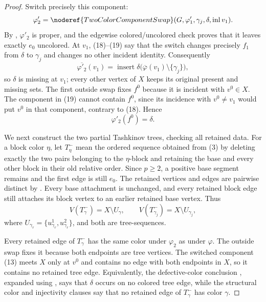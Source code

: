 \begin{proof}
Switch precisely this component:
\[
 \varphi'_2=\noderef{TwoColorComponentSwap}
   (G,\varphi'_1,\gamma_j,\delta,\operatorname{inl}v_1).
\]
By , $\varphi'_2$ is proper, and
the edgewise colored/uncolored check proves that it leaves exactly $e_0$
uncolored.  At $v_1$, (18)--(19) say that the switch changes precisely
$f_1$ from $\delta$ to $\gamma_j$ and changes no other incident identity.
Consequently
\[
 \overline{\varphi'_2}(v_1)
 =\operatorname{insert}\delta
   \bigl(\overline\varphi(v_1)\setminus\{\gamma_j\}\bigr),   \tag{20}
\]
so $\delta$ is missing at $v_1$; every other vertex of $X$ keeps its
original present and missing sets.  The first outside swap fixes $f^0$
because it is incident with $v^0\in X$.  The component in (19) cannot
contain $f^0$, since its incidence with $v^0\ne v_1$ would put $v^0$ in
that component, contrary to (18).  Hence
\[
 \varphi'_2(f^0)=\delta.                                     \tag{21}
\]

We next construct the two partial Tashkinov trees, checking all retained
data.  For a block color $\eta$, let $T^-_\eta$ mean the ordered sequence
obtained from (3) by deleting exactly the two pairs belonging to the
$\eta$-block and retaining the base and every other block in their old
relative order.  Since $p\ge2$, a positive base segment remains and the
first edge is still $e_0$.  The retained vertices and edges are pairwise
distinct by .  Every base attachment is unchanged,
and every retained block edge still attaches its block vertex to an
earlier retained base vertex.  Thus
\[
 V(T^-_\gamma)=X\setminus U_\gamma,\qquad
 V(T^-_{\gamma_j})=X\setminus U_{\gamma_j},                  \tag{22}
\]
where $U_{\gamma_r}=\{u^1_{\gamma_r},u^2_{\gamma_r}\}$, and both are
tree-sequences.

Every retained edge of $T^-_\gamma$ has the same color under $\varphi_2$
as under $\varphi$.  The outside swap fixes it because both endpoints are
tree vertices.  The switched component (13) meets $X$ only at $v^0$ and
contains no edge with both endpoints in $X$, so it contains no retained
tree edge.  Equivalently, the defective-color conclusion
, expanded using
, says that $\delta$ occurs on no colored tree
edge, while the structural color and injectivity clauses say that no
retained edge of $T^-_\gamma$ has color $\gamma$.


\end{proof}
